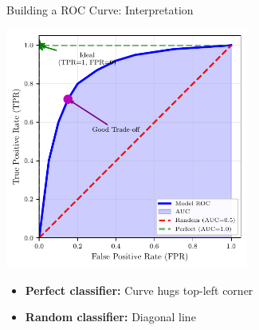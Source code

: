 \documentclass{beamer}
\begin{document}
\begin{frame}{Building a ROC Curve: Interpretation}
\begin{center}
\includegraphics[width=0.6\textwidth]{roc-curve-diagram.pdf}
\end{center}

\begin{itemize}
    \item \textbf{Perfect classifier:} Curve hugs top-left corner
    \item \textbf{Random classifier:} Diagonal line
\end{itemize}
\end{frame}
\end{document}
